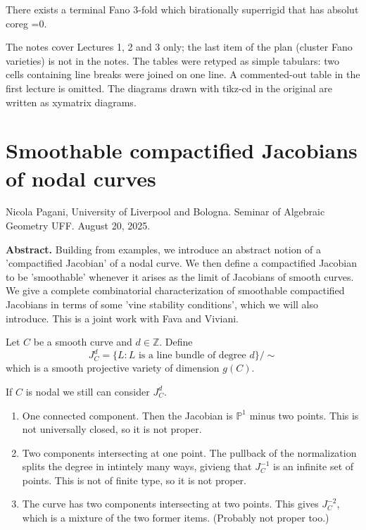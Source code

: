 \begin{theorem}[Kaloghiro, 10]
\label{theorem-moraga-24}
There exists a terminal Fano 3-fold which
birationally superrigid that has absolut
coreg =0.
\end{theorem}

\medskip{} The
notes cover Lectures 1, 2 and 3 only; the
last item of the plan (cluster Fano
varieties) is not in the notes. The tables
were retyped as simple tabulars: two cells
containing line breaks were joined on one
line. A commented-out table in the first
lecture is omitted. The diagrams drawn with
tikz-cd in the original are written as
xymatrix diagrams.

\section{Smoothable compactified Jacobians of
nodal curves}
\label{section-smoot-compa-jacob-nodal}

\noindent
Nicola Pagani, University of Liverpool and
Bologna.
Seminar of Algebraic Geometry UFF.
August 20, 2025.

\medskip\noindent
{\bf Abstract.} Building from examples, we
introduce an abstract notion of a
'compactified Jacobian' of a nodal curve. We
then define a compactified Jacobian
to be 'smoothable' whenever it arises as the
limit of Jacobians of smooth
curves. We give a complete combinatorial
characterization of smoothable
compactified Jacobians in terms of some 'vine
stability conditions', which we
will also introduce. This is a joint work
with Fava and Viviani.

\medskip\noindent



Let $C$ be a smooth curve and $d \in
\mathbb{Z}$. Define
$$
J^d_C=\{L:\text{$L$ is a line bundle of
degree $d$}\}/\sim
$$
which is a smooth projective variety of
dimension $g(C)$.

If $C$ is nodal we still can consider
$J^d_C$.
\begin{enumerate}
\item One connected component. Then the
Jacobian is $\mathbb{P}^1$ minus two
points. This is not universally closed, so it
is not proper.
\item Two components intersecting at one
point.
The pullback of the normalization splits the
degree in
intintely many ways, givieng that $J^{-1}_C$
is an infinite set of points. This
is not of finite type, so it is not proper.
\item The curve has two components
intersecting at two points.
This gives $J^{-2}_C$,
 which is a mixture of the two former items.
 (Probably not proper too.)
\end{enumerate}

